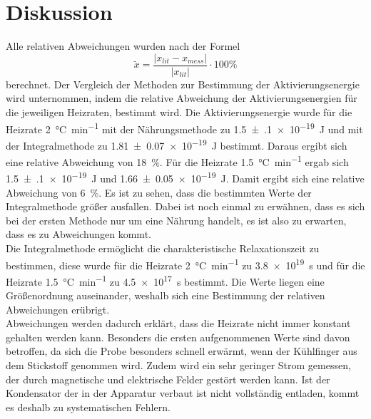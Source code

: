 \section{Diskussion}
\label{sec:Diskussion}
Alle relativen Abweichungen wurden nach der Formel
\begin{equation*}
  \tilde{x} = \frac{ \lvert x_{lit} - x_{mess} \rvert}{\lvert x_{lit} \rvert}
  \cdot 100 \%
\end{equation*}
berechnet. Der Vergleich der Methoden zur Bestimmung der Aktivierungsenergie wird unternommen, indem 
die relative Abweichung der Aktivierungsenergien für die jeweiligen Heizraten, bestimmt wird.
Die Aktivierungsenergie wurde für die Heizrate \SI{2}{\celsius\per\minute} mit der Nährungsmethode 
zu \SI{1.5(1)e-19}{\joule} und mit der Integralmethode zu \SI{1.81(7)e-19}{\joule} bestimmt. 
Daraus ergibt sich eine relative Abweichung von \SI{18}{\percent}. Für die Heizrate 
\SI{1.5}{\celsius\per\minute} ergab sich \SI{1.5(1)e-19}{\joule} und \SI{1.66(5)e-19}{\joule}. Damit ergibt 
sich eine relative Abweichung von \SI{6}{\percent}. Es ist zu sehen, dass die bestimmten Werte 
der Integralmethode größer ausfallen. Dabei ist noch einmal zu erwähnen, dass es sich bei der ersten 
Methode nur um eine Nährung handelt, es ist also zu erwarten, dass es zu Abweichungen kommt.\\
Die Integralmethode ermöglicht die charakteristische Relaxationszeit zu bestimmen, diese wurde 
für die Heizrate \SI{2}{\celsius\per\minute} zu \SI{3.8e+19}{\second} und für die Heizrate 
\SI{1.5}{\celsius\per\minute} zu \SI{4.5e+17}{\second} bestimmt. Die Werte liegen eine Größenordnung 
auseinander, weshalb sich eine Bestimmung der relativen Abweichungen erübrigt. \\
Abweichungen werden dadurch erklärt, dass die Heizrate nicht immer konstant gehalten werden kann. 
Besonders die ersten aufgenommenen Werte sind davon betroffen, da sich die Probe besonders schnell 
erwärmt, wenn der Kühlfinger aus dem Stickstoff genommen wird. Zudem wird ein sehr geringer Strom 
gemessen, der durch magnetische und elektrische Felder gestört werden kann. Ist der Kondensator der in 
der Apparatur verbaut ist nicht vollständig entladen, kommt es deshalb zu systematischen Fehlern. 

